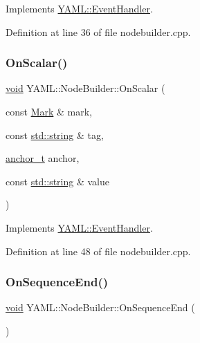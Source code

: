 Implements \mbox{\hyperlink{class_y_a_m_l_1_1_event_handler_aca632ae43f71b6c4f13252d15191f380}{Y\+A\+M\+L\+::\+Event\+Handler}}.



Definition at line 36 of file nodebuilder.\+cpp.

\mbox{\label{class_y_a_m_l_1_1_node_builder_a433706a6b7ef7fbca180af1e4b83f2b9}} 
\subsubsection{\texorpdfstring{OnScalar()}{OnScalar()}}
{\footnotesize\ttfamily \mbox{\hyperlink{glad_8h_a950fc91edb4504f62f1c577bf4727c29}{void}} Y\+A\+M\+L\+::\+Node\+Builder\+::\+On\+Scalar (\begin{DoxyParamCaption}\item[{const \mbox{\hyperlink{struct_y_a_m_l_1_1_mark}{Mark}} \&}]{mark,  }\item[{const \mbox{\hyperlink{glad_8h_ac83513893df92266f79a515488701770}{std\+::string}} \&}]{tag,  }\item[{\mbox{\hyperlink{namespace_y_a_m_l_abeff1798814ae3402fc5665fdcad1de6}{anchor\+\_\+t}}}]{anchor,  }\item[{const \mbox{\hyperlink{glad_8h_ac83513893df92266f79a515488701770}{std\+::string}} \&}]{value }\end{DoxyParamCaption})\hspace{0.3cm}{\ttfamily [virtual]}}



Implements \mbox{\hyperlink{class_y_a_m_l_1_1_event_handler_a1f381a132754352eee6b8dcd218e3abc}{Y\+A\+M\+L\+::\+Event\+Handler}}.



Definition at line 48 of file nodebuilder.\+cpp.

\mbox{\label{class_y_a_m_l_1_1_node_builder_ae699f0db4856fd954120ea3dd5d3b839}} 
\subsubsection{\texorpdfstring{OnSequenceEnd()}{OnSequenceEnd()}}
{\footnotesize\ttfamily \mbox{\hyperlink{glad_8h_a950fc91edb4504f62f1c577bf4727c29}{void}} Y\+A\+M\+L\+::\+Node\+Builder\+::\+On\+Sequence\+End (\begin{DoxyParamCaption}{ }\end{DoxyParamCaption})\hspace{0.3cm}{\ttfamily [virtual]}}



